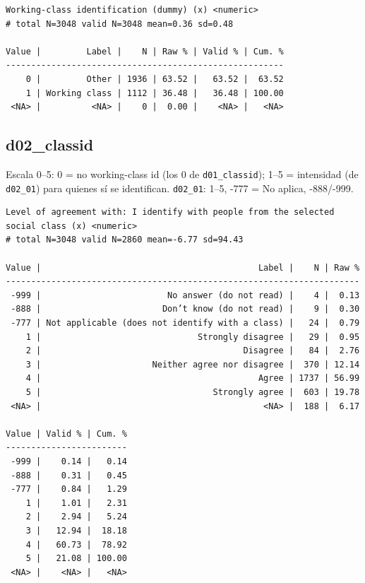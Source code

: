 \documentclass[
  letterpaper,
  DIV=11,
  numbers=noendperiod]{scrreprt}
\newenvironment{Shaded}{\begin{snugshade}}{\end{snugshade}}
\newcommand{\FunctionTok}[1]{\textcolor[rgb]{0.28,0.35,0.67}{#1}}
\newcommand{\NormalTok}[1]{\textcolor[rgb]{0.00,0.23,0.31}{#1}}
\newcommand{\SpecialCharTok}[1]{\textcolor[rgb]{0.37,0.37,0.37}{#1}}
\begin{document}
\begin{verbatim}
Working-class identification (dummy) (x) <numeric> 
# total N=3048 valid N=3048 mean=0.36 sd=0.48

Value |         Label |    N | Raw % | Valid % | Cum. %
-------------------------------------------------------
    0 |         Other | 1936 | 63.52 |   63.52 |  63.52
    1 | Working class | 1112 | 36.48 |   36.48 | 100.00
 <NA> |          <NA> |    0 |  0.00 |    <NA> |   <NA>
\end{verbatim}

\subsection{d02\_classid}\label{d02_classid}

Escala 0--5: 0 = no working-class id (los 0 de \texttt{d01\_classid});
1--5 = intensidad (de \texttt{d02\_01}) para quienes sí se identifican.
\texttt{d02\_01}: 1--5, -777 = No aplica, -888/-999.

\begin{Shaded}
\end{Shaded}

\begin{verbatim}
Level of agreement with: I identify with people from the selected social class (x) <numeric> 
# total N=3048 valid N=2860 mean=-6.77 sd=94.43

Value |                                           Label |    N | Raw %
----------------------------------------------------------------------
 -999 |                         No answer (do not read) |    4 |  0.13
 -888 |                        Don’t know (do not read) |    9 |  0.30
 -777 | Not applicable (does not identify with a class) |   24 |  0.79
    1 |                               Strongly disagree |   29 |  0.95
    2 |                                        Disagree |   84 |  2.76
    3 |                      Neither agree nor disagree |  370 | 12.14
    4 |                                           Agree | 1737 | 56.99
    5 |                                  Strongly agree |  603 | 19.78
 <NA> |                                            <NA> |  188 |  6.17

Value | Valid % | Cum. %
------------------------
 -999 |    0.14 |   0.14
 -888 |    0.31 |   0.45
 -777 |    0.84 |   1.29
    1 |    1.01 |   2.31
    2 |    2.94 |   5.24
    3 |   12.94 |  18.18
    4 |   60.73 |  78.92
    5 |   21.08 | 100.00
 <NA> |    <NA> |   <NA>
\end{verbatim}
\end{document}
